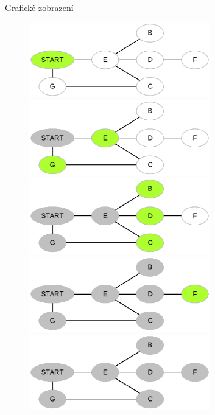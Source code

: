 \documentclass{beamer}
\begin{document}
\begin{frame}{Grafické zobrazení}
	\begin{figure}
    \begin{overprint}
    \centering\includegraphics[width=0.7\textwidth]{./img/2.eps}
    \centering\includegraphics[width=0.7\textwidth]{./img/3.eps}
    \centering\includegraphics[width=0.7\textwidth]{./img/4.eps}
    \centering\includegraphics[width=0.7\textwidth]{./img/5.eps}
    \centering\includegraphics[width=0.7\textwidth]{./img/6.eps}
    \end{overprint}
\end{figure}
\end{frame}
\end{document}
